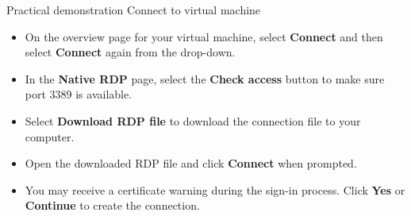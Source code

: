 \documentclass[aspectratio=169,xcolor=dvipsnames]{beamer}
\begin{document}
	\begin{frame}{Practical demonstration}
		Connect to virtual machine
		\begin{itemize}
			\item On the overview page for your virtual machine, select \textbf{Connect} and then select \textbf{Connect} again from the drop-down.
			\item In the \textbf{Native RDP} page, select the \textbf{Check access} button to make sure port 3389 is available.
			\item Select \textbf{Download RDP file} to download the connection file to your computer.
			\item Open the downloaded RDP file and click \textbf{Connect} when prompted.
			\item You may receive a certificate warning during the sign-in process. Click \textbf{Yes} or \textbf{Continue} to create the connection.
		\end{itemize}
	\end{frame}
\end{document}
